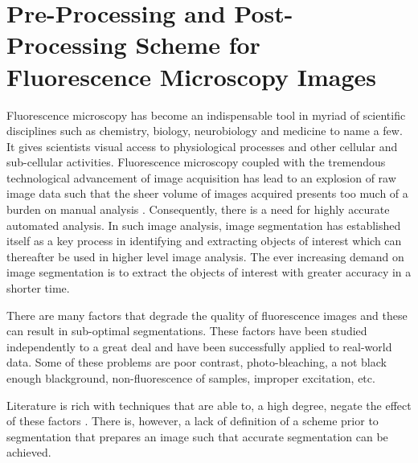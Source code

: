 
\chapter{Pre-Processing and Post-Processing Scheme for Fluorescence Microscopy Images} %

\label{chap:Chapter4} %


Fluorescence microscopy has become an indispensable tool \citep{Matula2012} in myriad of scientific disciplines such as chemistry, biology, neurobiology and medicine to name a few. It gives scientists visual access to physiological processes and other cellular and sub-cellular activities.
Fluorescence microscopy coupled with the tremendous technological advancement of image acquisition has lead to an explosion of raw image data such that the sheer volume of images acquired presents too much of a burden on manual analysis \citep{Matula2012}.
Consequently, there is a need for highly accurate automated analysis.
In such image analysis, image segmentation has established itself as a key process in identifying and extracting objects of interest which can thereafter be used in higher level image analysis.
The ever increasing demand on image segmentation is to extract the objects of interest with greater accuracy in a shorter time.

There are many factors that degrade the quality of fluorescence images and these can result in sub-optimal segmentations.
These factors have been studied independently to a great deal and have been successfully applied to real-world data.
Some of these problems are poor contrast, photo-bleaching, a not black enough blackground, non-fluorescence of samples, improper excitation, etc.

Literature is rich with techniques that are able to, a high degree, negate the effect of these factors \cite{Lysaker2004,Wang2008,Zhou2013}. There is, however, a lack of definition of a scheme prior to segmentation that prepares an image such that accurate segmentation can be achieved.

